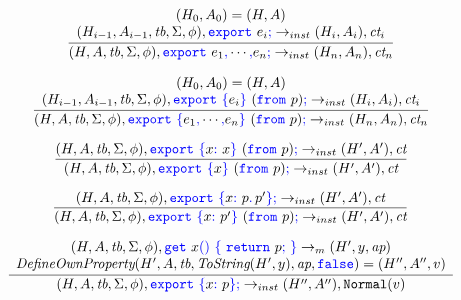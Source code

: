 \documentclass[a4paper]{article}
\newcommand{\code}[1]{\textcolor{blue}{\tt #1}}
\newcommand{\mydot}{.\,}
\newcommand{\tb}{\emph{tb}}
\newcommand{\ct}{\emph{ct}}
\newcommand{\ap}{\emph{ap}}
\begin{document}
\begin{equation*}
\frac{
    \begin{array}{c}
    (H_0, A_0) = (H, A) \\
    (H_{i-1}, A_{i-1}, \tb, \Sigma, \phi), \code{export}\ e_i\code{;} \rightarrow_{inst} (H_i, A_i), \ct_i \\
    \end{array}
}{
    (H, A, \tb, \Sigma, \phi), \code{export}\ e_1\code{,} \cdots\code{,} e_n\code{;} \rightarrow_{inst} (H_n, A_n), \ct_n
}
\end{equation*}

\begin{equation*}
\frac{
    \begin{array}{c}
    (H_0, A_0) = (H, A) \\
    (H_{i-1}, A_{i-1}, \tb, \Sigma, \phi), \code{export}\ \code{\{}e_i\code{\}}\ (\code{from}\ p)\code{;} \rightarrow_{inst} (H_i, A_i), \ct_i \\
    \end{array}
}{
    (H, A, \tb, \Sigma, \phi), \code{export}\ \code{\{}e_1\code{,} \cdots\code{,} e_n\code{\}}\ (\code{from}\ p)\code{;} \rightarrow_{inst} (H_n, A_n), \ct_n
}
\end{equation*}

\begin{equation*}
\frac{
    (H, A, \tb, \Sigma, \phi), \code{export}\ \code{\{}x\code{:}\ x\code{\}}\ (\code{from}\ p)\code{;} \rightarrow_{inst} (H', A'), \ct
}{
    (H, A, \tb, \Sigma, \phi), \code{export}\ \code{\{}x\code{\}}\ (\code{from}\ p)\code{;} \rightarrow_{inst} (H', A'), \ct
}
\end{equation*}

\begin{equation*}
\frac{
    (H, A, \tb, \Sigma, \phi), \code{export}\ \code{\{}x\code{:}\ p\code{\mydot}p'\code{\}}\code{;} \rightarrow_{inst} (H', A'), \ct
}{
    (H, A, \tb, \Sigma, \phi), \code{export}\ \code{\{}x\code{:}\ p'\code{\}}\ (\code{from}\ p)\code{;} \rightarrow_{inst} (H', A'), \ct
}
\end{equation*}

\begin{equation*}
\frac{
    \begin{array}{c}
    (H, A, \tb, \Sigma, \phi), \code{get}\ x\code{()}\ \code{\{}\ \code{return}\ p\code{;}\ \code{\}} \rightarrow_m (H', y, \ap) \\
    \emph{DefineOwnProperty}(H', A, \tb, \emph{ToString}(H', y), \ap, \code{false}) = (H'', A'', v)
    \end{array}
}{
    (H, A, \tb, \Sigma, \phi), \code{export}\ \code{\{}x\code{:}\ p\code{\}}\code{;} \rightarrow_{inst} (H'', A''), \texttt{Normal}(v)
}
\end{equation*}
\end{document}
